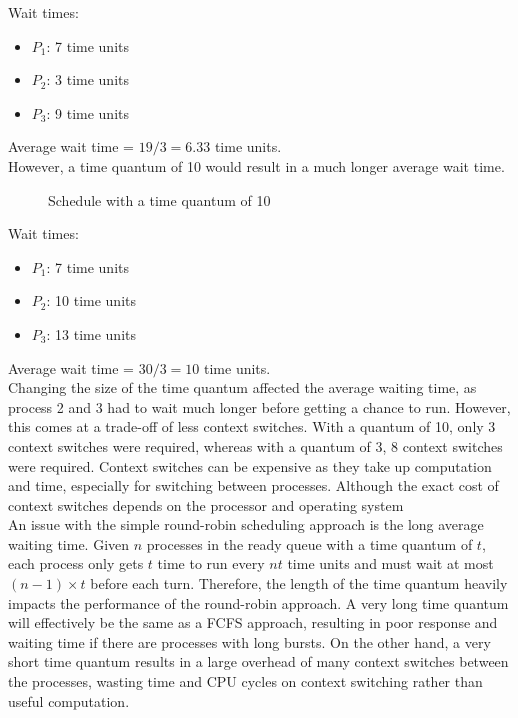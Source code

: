 \documentclass{article}
\newcommand{\n}[0]{\\[\baselineskip]}
\begin{document}
\noindent Wait times:
\begin{itemize}
\item $P_{1}$: 7 time units
\item $P_{2}$: 3 time units
\item $P_{3}$: 9 time units
\end{itemize}
\noindent Average wait time = $19 / 3 = 6.33$ time units.
\n
However, a time quantum of 10 would result in a much longer average wait time.
\begin{figure}[H]
\centering
{}
\caption{Schedule with a time quantum of 10}
\end{figure}
\noindent Wait times:
\begin{itemize}
\item $P_{1}$: 7 time units
\item $P_{2}$: 10 time units
\item $P_{3}$: 13 time units
\end{itemize}
\noindent Average wait time = $30 / 3 = 10$ time units.
\n
Changing the size of the time quantum affected the average waiting time, as process 2 and 3 had to wait much longer before getting a chance to run. However, this comes at a trade-off of less context switches. With a quantum of 10, only 3 context switches were required, whereas with a quantum of 3, 8 context switches were required. Context switches can be expensive as they take up computation and time, especially for switching between processes. Although the exact cost of context switches depends on the processor and operating system
\n
An issue with the simple round-robin scheduling approach is the long average waiting time. Given $n$ processes in the ready queue with a time quantum of $t$, each process only gets $t$ time to run every $nt$ time units and must wait at most $(n - 1) \times t$ before each turn. Therefore, the length of the time quantum heavily impacts the performance of the round-robin approach. A very long time quantum will effectively be the same as a FCFS approach, resulting in poor response and waiting time if there are processes with long bursts. On the other hand, a very short time quantum results in a large overhead of many context switches between the processes, wasting time and CPU cycles on context switching rather than useful computation. 
\end{document}
